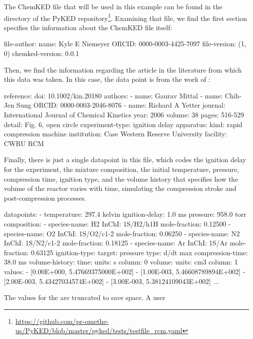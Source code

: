 \documentclass[12pt]{ussci}
\newcommand\ck{ChemKED}
\begin{document}
The \ck{} file that will be used in this example can be found in the
 directory of the PyKED
repository\footnote{\url{https://github.com/pr-omethe-us/PyKED/blob/master/pyked/tests/testfile_rcm.yaml}}.
Examining that file, we find the first section specifies the information about
the \ck{} file itself:
%
\begin{yamlbox}
file-author:
  name: Kyle E Niemeyer
  ORCID: 0000-0003-4425-7097
file-version: (1, 0)
chemked-version: 0.0.1
\end{yamlbox}
%
Then, we find the information regarding the article in the literature from which
this data was taken. In this case, the data point is from the work of
\textcite{Mittal2006a}:
%
\begin{yamlbox}
reference:
  doi: 10.1002/kin.20180
  authors:
    - name: Gaurav Mittal
    - name: Chih-Jen Sung
      ORCID: 0000-0003-2046-8076
    - name: Richard A Yetter
  journal: International Journal of Chemical Kinetics
  year: 2006
  volume: 38
  pages: 516-529
  detail: Fig. 6, open circle
experiment-type: ignition delay
apparatus:
  kind: rapid compression machine
  institution: Case Western Reserve University
  facility: CWRU RCM
\end{yamlbox}
%
Finally, there is just a single datapoint in this file, which codes the ignition
delay for the experiment, the mixture composition, the initial temperature,
pressure, compression time, ignition type, and the volume history that specifies
how the volume of the reactor varies with time, simulating the compression
stroke and post-compression processes.
%
\begin{yamlbox}
datapoints:
  - temperature: 297.4 kelvin
    ignition-delay: 1.0 ms
    pressure: 958.0 torr
    composition:
      - species-name: H2
        InChI: 1S/H2/h1H
        mole-fraction: 0.12500
      - species-name: O2
        InChI: 1S/O2/c1-2
        mole-fraction: 0.06250
      - species-name: N2
        InChI: 1S/N2/c1-2
        mole-fraction: 0.18125
      - species-name: Ar
        InChI: 1S/Ar
        mole-fraction: 0.63125
    ignition-type:
      target: pressure
      type: d/dt max
    compression-time: 38.0 ms
    volume-history:
      time:
        units: s
        column: 0
      volume:
        units: cm3
        column: 1
      values:
        - [0.00E+000, 5.47669375000E+002]
        - [1.00E-003, 5.46608789894E+002]
        - [2.00E-003, 5.43427034574E+002]
        - [3.00E-003, 5.38124109043E+002]
        ...
\end{yamlbox}
%
The values for the  are truncated to save space. A user
\end{document}
